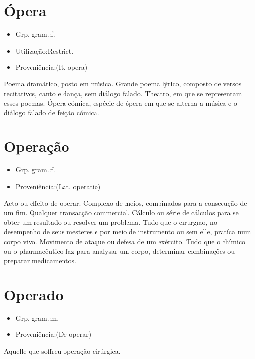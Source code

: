 \section{Ópera}
\begin{itemize}
\item {Grp. gram.:f.}
\end{itemize}
\begin{itemize}
\item {Utilização:Restrict.}
\end{itemize}
\begin{itemize}
\item {Proveniência:(It. \textunderscore opera\textunderscore )}
\end{itemize}
Poema dramático, posto em música.
Grande poema lýrico, composto de versos recitativos, canto e dança, sem diálogo falado.
Theatro, em que se representam esses poemas.
\textunderscore Ópera cómica\textunderscore , espécie de ópera em que se alterna a música e o diálogo falado de feição cómica.
\section{Operação}
\begin{itemize}
\item {Grp. gram.:f.}
\end{itemize}
\begin{itemize}
\item {Proveniência:(Lat. \textunderscore operatio\textunderscore )}
\end{itemize}
Acto ou effeito de operar.
Complexo de meios, combinados para a consecução de um fim.
Qualquer transacção commercial.
Cálculo ou série de cálculos para se obter um resultado ou resolver um problema.
Tudo que o cirurgião, no desempenho de seus mesteres e por meio de instrumento ou sem elle, pratíca num corpo vivo.
Movimento de ataque ou defesa de um exército.
Tudo que o chímico ou o pharmacêutico faz para analysar um corpo, determinar combinações ou preparar medicamentos.
\section{Operado}
\begin{itemize}
\item {Grp. gram.:m.}
\end{itemize}
\begin{itemize}
\item {Proveniência:(De \textunderscore operar\textunderscore )}
\end{itemize}
Aquelle que soffreu operação cirúrgica.

